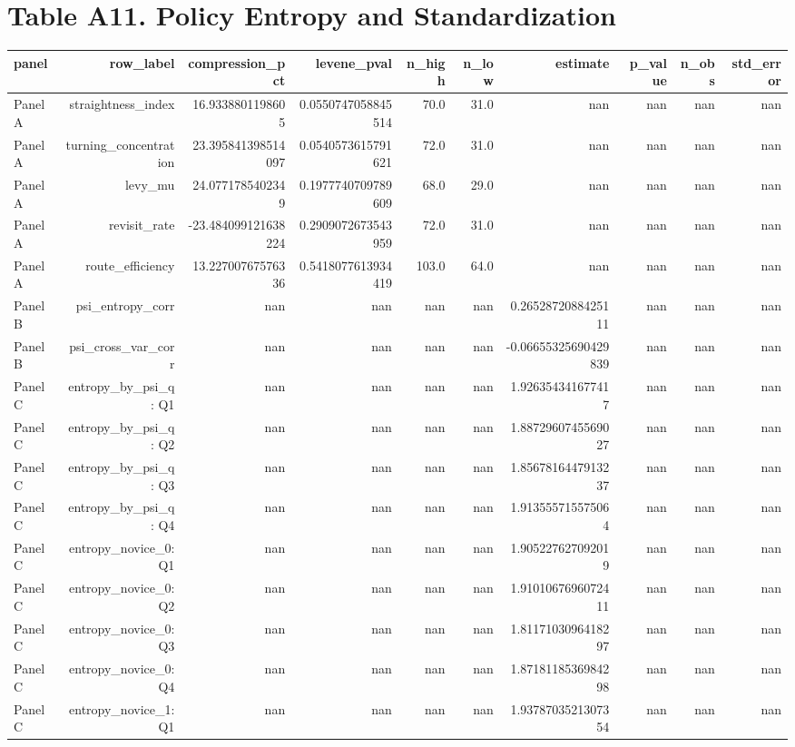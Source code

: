 \documentclass{article}
\begin{document}
\section*{Table A11. Policy Entropy and Standardization}
\begin{tabular}{lrrrrrrrrr}
\hline
panel & row_label & compression_pct & levene_pval & n_high & n_low & estimate & p_value & n_obs & std_error \\
\hline
Panel A & straightness\_index & 16.9338801198605 & 0.0550747058845514 & 70.0 & 31.0 & nan & nan & nan & nan \\
Panel A & turning\_concentration & 23.395841398514097 & 0.0540573615791621 & 72.0 & 31.0 & nan & nan & nan & nan \\
Panel A & levy\_mu & 24.0771785402349 & 0.1977740709789609 & 68.0 & 29.0 & nan & nan & nan & nan \\
Panel A & revisit\_rate & -23.484099121638224 & 0.2909072673543959 & 72.0 & 31.0 & nan & nan & nan & nan \\
Panel A & route\_efficiency & 13.22700767576336 & 0.5418077613934419 & 103.0 & 64.0 & nan & nan & nan & nan \\
Panel B & psi\_entropy\_corr & nan & nan & nan & nan & 0.2652872088425111 & nan & nan & nan \\
Panel B & psi\_cross\_var\_corr & nan & nan & nan & nan & -0.06655325690429839 & nan & nan & nan \\
Panel C & entropy\_by\_psi\_q: Q1 & nan & nan & nan & nan & 1.926354341677417 & nan & nan & nan \\
Panel C & entropy\_by\_psi\_q: Q2 & nan & nan & nan & nan & 1.8872960745569027 & nan & nan & nan \\
Panel C & entropy\_by\_psi\_q: Q3 & nan & nan & nan & nan & 1.8567816447913237 & nan & nan & nan \\
Panel C & entropy\_by\_psi\_q: Q4 & nan & nan & nan & nan & 1.913555715575064 & nan & nan & nan \\
Panel C & entropy\_novice\_0: Q1 & nan & nan & nan & nan & 1.905227627092019 & nan & nan & nan \\
Panel C & entropy\_novice\_0: Q2 & nan & nan & nan & nan & 1.9101067696072411 & nan & nan & nan \\
Panel C & entropy\_novice\_0: Q3 & nan & nan & nan & nan & 1.8117103096418297 & nan & nan & nan \\
Panel C & entropy\_novice\_0: Q4 & nan & nan & nan & nan & 1.8718118536984298 & nan & nan & nan \\
Panel C & entropy\_novice\_1: Q1 & nan & nan & nan & nan & 1.9378703521307354 & nan & nan & nan \\

\end{tabular}
\end{document}
